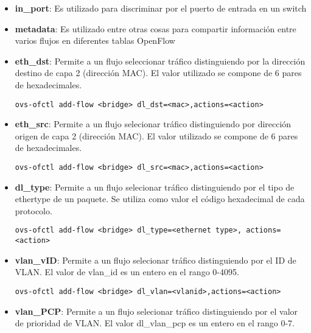 \begin{itemize}

\item \textbf{in\_port}: Es utilizado para discriminar por el puerto de entrada en un switch

\item \textbf{metadata}: Es utilizado entre otras cosas para compartir informaci\'on entre varios flujos en diferentes tablas OpenFlow

\item \textbf{eth\_dst}: Permite a un flujo seleccionar tr\'afico distinguiendo por la direcci\'on destino de capa 2 (dirección MAC). El valor utilizado se compone de 6 pares de hexadecimales.

\begin{center}
\texttt{ovs-ofctl add-flow <bridge> dl\_dst=<mac>,actions=<action>}
\end{center}

\item \textbf{eth\_src}: Permite a un flujo selecionar tr\'afico distinguiendo por direcci\'on origen de capa 2 (direcci\'on MAC). El valor utilizado se compone de 6 pares de hexadecimales.

\begin{center}
\texttt{ovs-ofctl add-flow <bridge> dl\_src=<mac>,actions=<action>}
\end{center}

\item \textbf{dl\_type}: Permite a un flujo selecionar tr\'afico distinguiendo por el tipo de ethertype de un paquete. Se utiliza como valor el c\'odigo hexadecimal de cada protocolo.

\begin{center}
\texttt{ovs-ofctl add-flow <bridge> dl\_type=<ethernet type>, actions=<action>}
\end{center}

\item \textbf{vlan\_vID}: Permite a un flujo selecionar tr\'afico distinguiendo por el ID de VLAN. El valor de vlan\_id es un entero en el rango 0-4095.

\begin{center}
\texttt{ovs-ofctl add-flow <bridge> dl\_vlan=<vlanid>,actions=<action>}
\end{center}

\item \textbf{vlan\_PCP}: Permite a un flujo selecionar tr\'afico distinguiendo por el valor de prioridad de VLAN. El valor dl\_vlan\_pcp es un entero en el rango 0-7.


\end{itemize}
